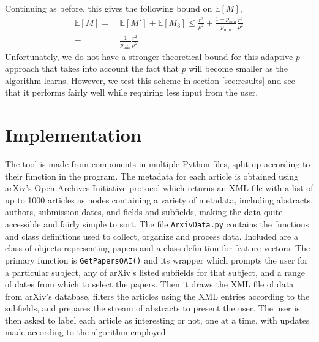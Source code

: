 \documentclass[12pt]{article}
\newcommand{\E}[0]{\mathbb{E}}
\begin{document}
Continuing as before, this gives the following bound on $\E[M]$,
\begin{align*}
\E[M] = &\ \E[M'] + \E[M_3] \leq \frac{r^2}{\rho^2} + \frac{1-p_{\min}}{p_{\min}} \frac{r^2}{\rho^2}\\
= &\ \frac{1}{p_{\min}}\frac{r^2}{\rho^2}
\end{align*}
Unfortunately, we do not have a stronger theoretical bound for this adaptive $p$ approach that takes into account the fact that $p$ will become smaller as the algorithm learns. However, we test this scheme in section \ref{sec:results} and see that it performs fairly well while requiring less input from the user.  

\section{Implementation}
The tool is made from components in multiple Python files, split up according to their function in the program.
The metadata for each article is obtained using arXiv's Open Archives Initiative protocol which returns an XML file with a list of up to 1000 articles as nodes containing a variety of metadata, including abstracts, authors, submission dates, and fields and subfields, making the data quite accessible and fairly simple to sort.
The file {\tt ArxivData.py} contains the functions and class definitions used to collect, organize and process data. Included are a class of objects representing papers and a class definition for feature vectors.
%
%
The primary function is {\tt GetPapersOAI()} and its wrapper which prompts the user for a particular subject, any of arXiv's listed subfields for that subject, and a range of dates from which to select the papers.
Then it draws the XML file of data from arXiv's database, filters the articles using the XML entries according to the subfields, and prepares the stream of abstracts to present the user.
The user is then asked to label each article as interesting or not, one at a time, with updates made according to the algorithm employed.



\end{document}
